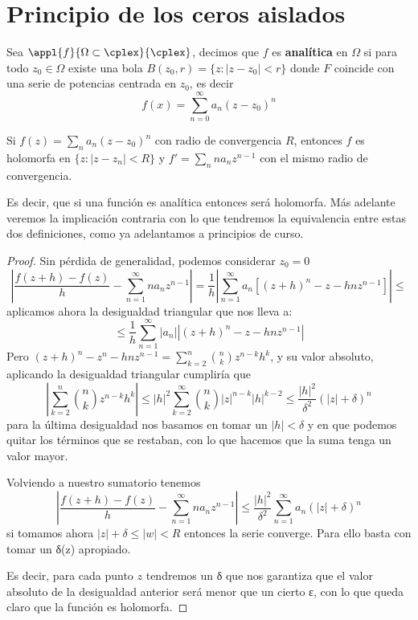 \documentclass{apuntes}
\begin{document}
\section{Principio de los ceros aislados}
\begin{defn}
Sea $\appl{f}{\Omega \subset \cplex}{\cplex}$, decimos que $f$ es \textbf{analítica} en $\Omega$ si para todo $z_0 \in \Omega$ existe una bola $B(z_0, r)=\{z: |z-z_0|<r\}$ donde $F$ coincide con una serie de potencias centrada en $z_0$, es decir
\[f(x)=\sum_{n=0}^{\infty} a_n(z-z_0)^n\]
\end{defn}

\begin{prop}
Si $f(z)=\sum_n a_n(z-z_0)^n$ con radio de convergencia $R$, entonces $f$ es holomorfa en $\{z: |z-z_n|<R\}$ y $f'=\sum_n n a_n z^{n-1}$ con el mismo radio de convergencia.

Es decir, que si una función es analítica entonces será holomorfa. Más adelante veremos la implicación contraria con lo que tendremos la equivalencia entre estas dos definiciones, como ya adelantamos a principios de curso.
\end{prop}
\begin{proof}
Sin pérdida de generalidad, podemos considerar $z_0 = 0$
\[\left|\frac{f(z+h)-f(z)}{h}- \sum_{n=1}^{\infty}na_nz^{n-1}\right|=\frac{1}{h}\left|\sum_{n=1}^{\infty} a_n \left[(z+h)^n-z-hnz^{n-1}\right] \right| \leq\]
aplicamos ahora la desigualdad triangular que nos lleva a:
\[\leq \frac{1}{h} \sum_{n=1}^{\infty}|a_n|\left| (z+h)^n-z-hnz^{n-1} \right |\]
Pero $(z+h)^n -z^n-hnz^{n-1} = \sum_{k=2}^{n}{n \choose k} z^{n-k}h^k$, y su valor absoluto, aplicando la desigualdad triangular cumpliría que
\[\left|\sum_{k=2}^{n}{n \choose k} z^{n-k}h^k \right| \leq |h|^2 \sum_{k=2}^{\infty}{n \choose k}|z|^{n-k}|h|^{k-2} \leq \frac{|h|^2}{δ^2} \left( |z| + δ\right)^n\]
para la última desigualdad nos basamos en tomar un $|h|<δ$ y en que podemos quitar los términos que se restaban, con lo que hacemos que la suma tenga un valor mayor.

Volviendo a nuestro sumatorio tenemos
\[\left|\frac{f(z+h)-f(z)}{h}- \sum_{n=1}^{\infty}na_nz^{n-1}\right| \leq  \frac{|h|^2}{δ^2} \sum_{n=1}^{\infty} a_n\left( |z| + δ\right)^n\]
si tomamos ahora $|z|+δ \leq |w| < R$ entonces la serie converge. Para ello basta con tomar un δ(z) apropiado.

Es decir, para cada punto $z$ tendremos un δ que nos garantiza que el valor absoluto de la desigualdad anterior será menor que un cierto ε, con lo que queda claro que la función es holomorfa.

\end{proof}
\end{document}
